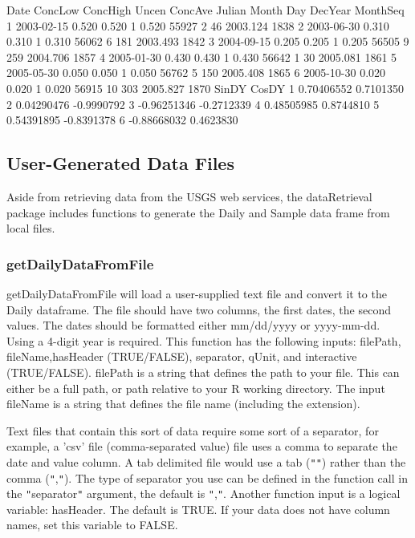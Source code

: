 \documentclass[a4paper,11pt]{article}
\begin{document}
\begin{Schunk}
\begin{Soutput}
        Date ConcLow ConcHigh Uncen ConcAve Julian Month Day  DecYear MonthSeq
1 2003-02-15   0.520    0.520     1   0.520  55927     2  46 2003.124     1838
2 2003-06-30   0.310    0.310     1   0.310  56062     6 181 2003.493     1842
3 2004-09-15   0.205    0.205     1   0.205  56505     9 259 2004.706     1857
4 2005-01-30   0.430    0.430     1   0.430  56642     1  30 2005.081     1861
5 2005-05-30   0.050    0.050     1   0.050  56762     5 150 2005.408     1865
6 2005-10-30   0.020    0.020     1   0.020  56915    10 303 2005.827     1870
        SinDY      CosDY
1  0.70406552  0.7101350
2  0.04290476 -0.9990792
3 -0.96251346 -0.2712339
4  0.48505985  0.8744810
5  0.54391895 -0.8391378
6 -0.88668032  0.4623830
\end{Soutput}
\end{Schunk}

\FloatBarrier
\subsection{User-Generated Data Files}
Aside from retrieving data from the USGS web services, the dataRetrieval package includes functions to generate the Daily and Sample data frame from local files.

\subsubsection{getDailyDataFromFile}
getDailyDataFromFile will load a user-supplied text file and convert it to the Daily dataframe. The file should have two columns, the first dates, the second values.  The dates should be formatted either mm/dd/yyyy or yyyy-mm-dd. Using a 4-digit year is required. This function has the following inputs: filePath, fileName,hasHeader (TRUE/FALSE), separator, qUnit, and interactive (TRUE/FALSE). filePath is a string that defines the path to your file. This can either be a full path, or path relative to your R working directory. The input fileName is a string that defines the file name (including the extension).

Text files that contain this sort of data require some sort of a separator, for example, a 'csv' file (comma-separated value) file uses a comma to separate the date and value column. A tab delimited file would use a tab (\texttt{"}\verb@\t@\texttt{"}) rather than the comma (\texttt{"},\texttt{"}). The type of separator you use can be defined in the function call in the \texttt{"}separator\texttt{"} argument, the default is \texttt{"},\texttt{\texttt{"}}. Another function input is a logical variable: hasHeader.  The default is TRUE. If your data does not have column names, set this variable to FALSE.
\end{document}
